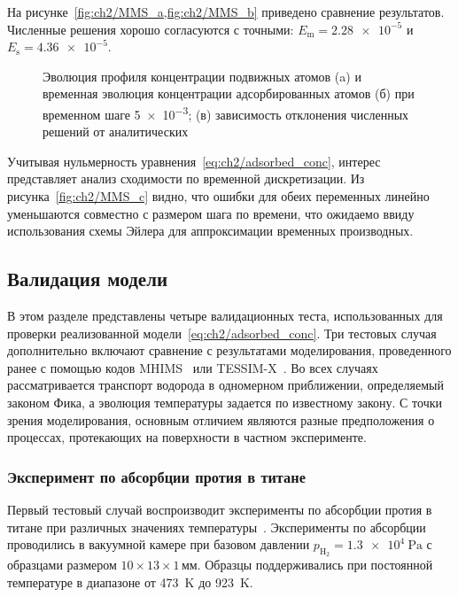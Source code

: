 На рисунке~\cref{fig:ch2/MMS_a,fig:ch2/MMS_b} приведено сравнение результатов. Численные решения хорошо согласуются с точными: \(E_\mathrm{m} = \num{2.28e-5} \) и \( E_\mathrm{s}= \num{4.36e-5} \).
\begin{figure}[ht]
    \caption{Эволюция профиля концентрации подвижных атомов (a) и временная эволюция концентрации адсорбированных атомов (б) при временном шаге \num{5e-3}; (в) зависимость отклонения численных решений от аналитических}\label{fig:ch2/MMS}
\end{figure}
Учитывая нульмерность уравнения~\cref{eq:ch2/adsorbed_conc}, интерес представляет анализ сходимости по временной дискретизации. Из рисунка~\cref{fig:ch2/MMS_c} видно, что ошибки для обеих переменных линейно уменьшаются совместно с размером шага по времени, что ожидаемо ввиду использования схемы Эйлера для аппроксимации временных производных.

\subsection{Валидация модели}\label{sec:ch2/sec3/subsec2}

В этом разделе представлены четыре валидационных теста, использованных для проверки реализованной модели~\cref{eq:ch2/adsorbed_conc}.  Три тестовых случая дополнительно включают сравнение с результатами моделирования, проведенного ранее с помощью кодов MHIMS~\cite{Hodille2024} или TESSIM-X~\cite{Schmid2023_2}. Во всех случаях рассматривается транспорт водорода в одномерном приближении, определяемый законом Фика, а эволюция температуры задается по известному закону. С точки зрения моделирования, основным отличием являются разные предположения о процессах, протекающих на поверхности в частном эксперименте.

\subsubsection{Эксперимент по абсорбции протия в титане}
Первый тестовый случай воспроизводит эксперименты по абсорбции протия в титане при различных значениях температуры~\cite{Hirooka1981}. Эксперименты по абсорбции проводились в вакуумной камере при базовом давлении $p_\mathrm{H_2}=\SI{1.3e4}{\pascal}$ с образцами размером $10\times13\times1$\,мм. Образцы поддерживались при постоянной температуре в диапазоне от \SI{473}{K} до \SI{923}{K}. 

